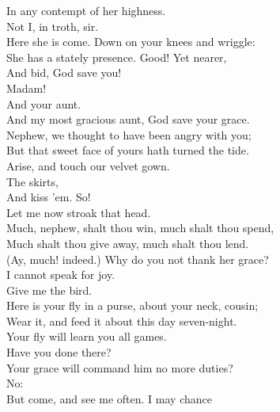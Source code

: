 \documentclass[a4paper,oneside,12pt]{memoir}
\begin{document}
\begin{drama*}
In any contempt of her highness.\\
\dapperspeaks {} Not I, in troth, sir.\\
\subtlespeaks Here she is come. Down on your knees and wriggle:\\
She has a stately presence. Good! Yet nearer,\\
And bid, God save you!\\
\dapperspeaks {} Madam!\\
\subtlespeaks {} And your aunt.\\
\dapperspeaks And my most gracious aunt, God save your grace.\\
\dolspeaks Nephew, we thought to have been angry with you;\\
But that sweet face of yours hath turned the tide.\\
Arise, and touch our velvet gown.\\
\subtlespeaks {} The skirts,\\
And kiss 'em. So!\\
\dolspeaks {} Let me now stroak that head.\\
Much, nephew, shalt thou win, much shalt thou spend,\\
Much shalt thou give away, much shalt thou lend.\\
\subtlespeaks (Ay, much! indeed.) Why do you not thank her grace?\\
\dapperspeaks I cannot speak for joy.\\
\dolspeaks {} Give me the bird.\\
Here is your fly in a purse, about your neck, cousin;\\
Wear it, and feed it about this day seven-night.\\
\subtlespeaks Your fly will learn you all games.\\
\facespeaks {}  Have you done there?\\
\subtlespeaks Your grace will command him no more duties?\\
\dolspeaks {} No:\\
But come, and see me often. I may chance\\

\end{drama*}
\end{document}
